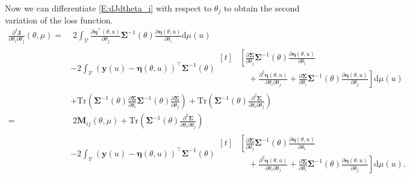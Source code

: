 \documentclass[twocolumn]{autart}
\theoremstyle{definition}
\theoremstyle{remark}
\newcommand{\diff}{\mathrm{d}}
\newcommand{\Tr}{\mathrm{Tr}}
\newcommand{\V}{\mathcal{V}}
\newcommand{\yb}{\mathbf{y}}
\newcommand{\Jb}{\mathbf{J}}
\newcommand{\Mb}{\mathbf{M}}
\newcommand{\etab}{\boldsymbol{\eta}}
\newcommand{\Sigmab}{\boldsymbol{\Sigma}}
\begin{document}
Now we can differentiate \eqref{E:dJdtheta_i} with respect to $\theta_j$ to obtain the second variation of the loss function.
\begin{equation}
\begin{aligned}
\frac{\partial^2 \Jb}{\partial\theta_i\partial\theta_j}(\theta,\mu)
=&\;
2\int_\V
\frac{\partial\etab^\top(\theta,u) }{\partial \theta_j}
\Sigmab^{-1}(\theta)
\frac{\partial\etab(\theta,u)}{\partial \theta_i}\diff \mu(u)
\\&
-2\int_\V
(\yb(u)-\etab(\theta,u))^\top 
\Sigmab^{-1}(\theta)
\begin{aligned}[t]
&\displaystyle
\left[\frac{\partial \Sigmab}{\partial\theta_j}\Sigmab^{-1}(\theta)
\frac{\partial\etab(\theta,u)}{\partial \theta_i}\right.
\\
&\displaystyle
\left.\quad
+
\frac{\partial^2\etab(\theta,u)}{\partial \theta_i\partial \theta_j}
+
\frac{\partial \Sigmab}{\partial\theta_i}\Sigmab^{-1}(\theta)
\frac{\partial\etab(\theta,u)}{\partial \theta_j}
\right]\diff \mu(u)
\end{aligned}
\\&
+
\Tr\left(\Sigmab^{-1}(\theta) \frac{\partial \Sigmab}{\partial\theta_i}\Sigmab^{-1}(\theta) \frac{\partial \Sigmab}{\partial\theta_j}\right)
+
\Tr\left(\Sigmab^{-1}(\theta) \frac{\partial^2 \Sigmab}{\partial\theta_i\partial\theta_j}\right)
\\
=&\;
2 \Mb_{ij}(\theta,\mu)
+
\Tr\left(\Sigmab^{-1}(\theta) \frac{\partial^2 \Sigmab}{\partial\theta_i\partial\theta_j}\right)
\\
&
-2\int_\V
(\yb(u)-\etab(\theta,u))^\top 
\Sigmab^{-1}(\theta)
\begin{aligned}[t]
&\displaystyle
\left[\frac{\partial \Sigmab}{\partial\theta_j}\Sigmab^{-1}(\theta)
\frac{\partial\etab(\theta,u)}{\partial \theta_i}\right.
\\
&\displaystyle
\left.\quad
+
\frac{\partial^2\etab(\theta,u)}{\partial \theta_i\partial \theta_j}
+
\frac{\partial \Sigmab}{\partial\theta_i}\Sigmab^{-1}(\theta)
\frac{\partial\etab(\theta,u)}{\partial \theta_j}
\right]\diff \mu(u).
\end{aligned}
\end{aligned}
\end{equation}
\end{document}

